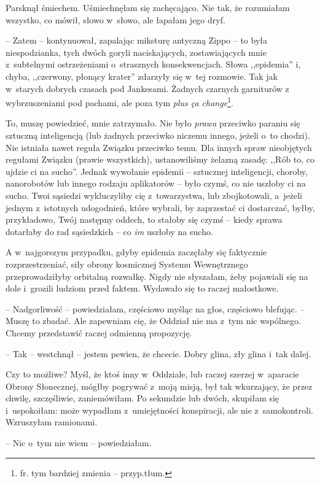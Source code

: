 \documentclass[oneside,polish,11pt,sfheadings]{mwbk}
\begin{document}
Parsknął śmiechem. Uśmiechnęłam się zachęcająco. Nie tak, że rozumiałam
wszystko, co mówił, słowo w~słowo, ale łapałam jego dryf.

-- Zatem -- kontynuował, zapalając miksturę antyczną Zippo -- to była
niespodzianka, tych dwóch goryli naciskających, zostawiających mnie z~subtelnymi ostrzeżeniami o~strasznych konsekwencjach. Słowa ,,epidemia''
i, chyba, ,,czerwony, płonący krater'' zdarzyły się w~tej rozmowie. Tak
jak w~starych dobrych czasach pod Jankesami. Żadnych czarnych garniturów
z wybrzuszeniami pod pachami, ale poza tym \textit{plus ça change}\footnote{ fr.
tym bardziej zmienia -- przyp.tłum.}.

To, muszę powiedzieć, mnie zatrzymało. Nie było \textit{prawa} przeciwko
paraniu się sztuczną inteligencją (lub żadnych przeciwko niczemu innego,
jeżeli o~to chodzi). Nie istniała nawet reguła Związku przeciwko temu.
Dla innych spraw nieobjętych regułami Związku (prawie wszystkich),
ustanowiliśmy żelazną zasadę: ,,Rób to, co ujdzie ci na sucho''. Jednak
wywołanie epidemii -- sztucznej inteligencji, choroby, nanorobotów lub
innego rodzaju aplikatorów -- było czymś, co nie uszłoby ci na sucho.
Twoi sąsiedzi wykluczyliby cię z~towarzystwa, lub zbojkotowali, a~jeżeli
jednym z~istotnych udogodnień, które wybrali, by zaprzestać ci
dostarczać, byłby, przykładowo, Twój następny oddech, to stałoby się
czymś -- kiedy sprawa dotarłaby do rad sąsiedzkich -- co \textit{im} uszłoby
na sucho.

A w~najgorszym przypadku, gdyby epidemia zaczęłaby się faktycznie
rozprzestrzeniać, siły obrony kosmicznej Systemu Wewnętrznego
przeprowadziłyby orbitalną rozwałkę. Nigdy nie słyszałam, żeby pojawiali
się na dole i~grozili ludziom przed faktem. Wydawało się to raczej
małostkowe.

-- Nadgorliwość -- powiedziałam, częściowo myśląc na głos, częściowo
blefując. -- Muszę to zbadać. Ale zapewniam cię, że Oddział nie ma z~tym
nic wspólnego. Chcemy przedstawić raczej odmienną propozycję.

-- Tak -- westchnął -- jestem pewien, że chcecie. Dobry glina, zły glina i~tak dalej.

Czy to możliwe? Myśl, że ktoś inny w~Oddziale, lub raczej szerzej w~aparacie Obrony Słonecznej, mógłby pogrywać z~moją misją, był tak
wkurzający, że przez chwilę, szczęśliwie, zaniemówiłam. Po sekundzie lub
dwóch, skupiłam się i~uspokoiłam: może wypadłam z~umiejętności
konspiracji, ale nie z~samokontroli. Wzruszyłam ramionami.

-- Nic o~tym nie wiem -- powiedziałam.
\end{document}
